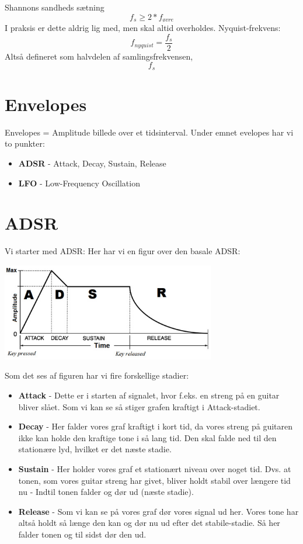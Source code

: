 \documentclass[12pt, letterpaper]{article}
\begin{document}
Shannons sandheds sætning
$$f_s\geq 2*f_{øvre}$$
I praksis er dette aldrig lig med, men skal altid overholdes. 
Nyquist-frekvens:
$$f_{nyquist} = \frac{f_s}{2}$$
Altså defineret som halvdelen af samlingsfrekvensen, $$f_s$$

\section{Envelopes}

Envelopes = Amplitude billede over et tidsinterval. 
Under emnet evelopes har vi to punkter: 
\begin{itemize}
\item \textbf{ADSR} - Attack, Decay, Sustain, Release
\item \textbf{LFO} - Low-Frequency Oscillation
\end{itemize}


\section{ADSR}


Vi starter med ADSR: 
Her har vi en figur over den basale ADSR: 

\begin{center}
\includegraphics[width=0.7\textwidth]{billeder/ADSR}
\end{center}

Som det ses af figuren har vi fire forskellige stadier: 
\begin{itemize}
\item \textbf{Attack} - Dette er i starten af signalet, hvor f.eks. en streng på en guitar bliver slået. Som vi kan se så stiger grafen kraftigt i Attack-stadiet. 
\item \textbf{Decay} - Her falder vores graf kraftigt i kort tid,  da vores streng på guitaren ikke kan holde den kraftige tone i så lang tid. Den skal falde ned til den stationære lyd, hvilket er det næste stadie.  
\item \textbf{Sustain} - Her holder vores graf et stationært niveau over noget tid. Dvs. at tonen, som vores guitar streng har givet, bliver holdt stabil over længere tid nu - Indtil tonen falder og dør ud (næste stadie). 
\item \textbf{Release} - Som vi kan se på vores graf dør vores signal ud her. Vores tone har altså holdt så længe den kan og dør nu ud efter det stabile-stadie. Så her falder tonen og til sidst dør den ud. 
\end{itemize}
\newpage
\end{document}
